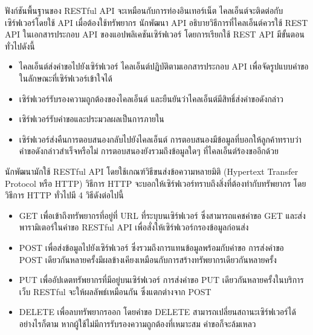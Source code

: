 \documentclass[12pt,oneside,openright,a4paper]{cpe-thai-project}
\begin{document}
    \hspace{1cm}ฟังก์ชันพื้นฐานของ RESTful API จะเหมือนกับการท่องอินเทอร์เน็ต ไคลเอ็นต์จะติดต่อกับเซิร์ฟเวอร์โดยใช้ API 
    เมื่อต้องใช้ทรัพยากร นักพัฒนา API อธิบายวิธีการที่ไคลเอ็นต์ควรใช้ REST API ในเอกสารประกอบ API ของแอปพลิเคชันเซิร์ฟเวอร์ 
    โดยการเรียกใช้ REST API มีขั้นตอนทั่วไปดังนี้
    \begin{itemize}
      \item ไคลเอ็นต์ส่งคำขอไปยังเซิร์ฟเวอร์ ไคลเอ็นต์ปฏิบัติตามเอกสารประกอบ API เพื่อจัดรูปแบบคำขอในลักษณะที่เซิร์ฟเวอร์เข้าใจได้
      \item เซิร์ฟเวอร์รับรองความถูกต้องของไคลเอ็นต์ และยืนยันว่าไคลเอ็นต์มีสิทธิ์ส่งคำขอดังกล่าว
      \item เซิร์ฟเวอร์รับคำขอและประมวลผลเป็นการภายใน
      \item เซิร์ฟเวอร์ส่งคืนการตอบสนองกลับไปยังไคลเอ็นต์ การตอบสนองมีข้อมูลที่บอกให้ลูกค้าทราบว่าคำขอดังกล่าวสำเร็จหรือไม่ การตอบสนองยังรวมถึงข้อมูลใดๆ ที่ไคลเอ็นต์ร้องขออีกด้วย
    \end{itemize}
    \hspace{1cm}นักพัฒนามักใช้ RESTful API โดยใช้เกณฑ์วิธีขนส่งข้อความหลายมิติ (Hypertext Transfer Protocol หรือ HTTP) 
    วิธีการ HTTP จะบอกให้เซิร์ฟเวอร์ทราบถึงสิ่งที่ต้องทำกับทรัพยากร โดยวิธีการ HTTP ทั่วไปมี 4 วิธีดังต่อไปนี้
    \begin{itemize}
      \item GET
            \newline เพื่อเข้าถึงทรัพยากรที่อยู่ที่ URL ที่ระบุบนเซิร์ฟเวอร์ ซึ่งสามารถแคชคำขอ GET และส่งพารามิเตอร์ในคำขอ RESTful API เพื่อสั่งให้เซิร์ฟเวอร์กรองข้อมูลก่อนส่ง
      \item POST
            \newline เพื่อส่งข้อมูลไปยังเซิร์ฟเวอร์ ซึ่งรวมถึงการแทนข้อมูลพร้อมกับคำขอ การส่งคำขอ POST เดียวกันหลายครั้งมีผลข้างเคียงเหมือนกับการสร้างทรัพยากรเดียวกันหลายครั้ง
      \item PUT
            \newline เพื่ออัปเดตทรัพยากรที่มีอยู่บนเซิร์ฟเวอร์ การส่งคำขอ PUT เดียวกันหลายครั้งในบริการเว็บ RESTful จะให้ผลลัพธ์เหมือนกัน ซึ่งแตกต่างจาก POST
      \item DELETE
            \newline เพื่อลบทรัพยากรออก โดยคำขอ DELETE สามารถเปลี่ยนสถานะเซิร์ฟเวอร์ได้ อย่างไรก็ตาม หากผู้ใช้ไม่มีการรับรองความถูกต้องที่เหมาะสม คำขอก็จะล้มเหลว
    \end{itemize}
\end{document}
